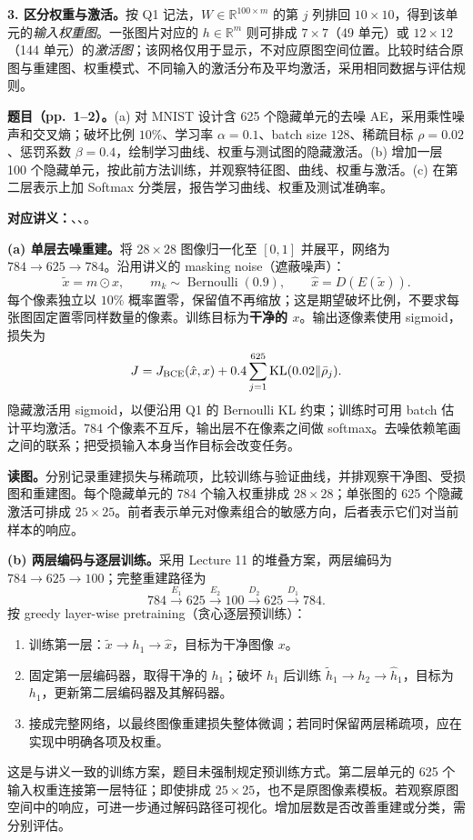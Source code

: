 \textbf{3. 区分权重与激活。}按 Q1 记法，$W\in\mathbb R^{100\times m}$ 的第 $j$ 列排回 $10\times10$，得到该单元的\emph{输入权重图}。一张图片对应的 $h\in\mathbb R^m$ 则可排成 $7\times7$（49 单元）或 $12\times12$（144 单元）的\emph{激活图}；该网格仅用于显示，不对应原图空间位置。比较时结合原图与重建图、权重模式、不同输入的激活分布及平均激活，采用相同数据与评估规则。

\nopagebreak[4]
\textbf{题目（pp.~1--2）。}(a) 对 MNIST 设计含 625 个隐藏单元的去噪 AE，采用乘性噪声和交叉熵；破坏比例 $10\%$、学习率 $\alpha=0.1$、batch size $128$、稀疏目标 $\rho=0.02$、惩罚系数 $\beta=0.4$，绘制学习曲线、权重与测试图的隐藏激活。(b) 增加一层 100 个隐藏单元，按此前方法训练，并观察特征图、曲线、权重与激活。(c) 在第二层表示上加 Softmax 分类层，报告学习曲线、权重及测试准确率。

\textbf{对应讲义：}、、。

\textbf{(a) 单层去噪重建。}将 $28\times28$ 图像归一化至 $[0,1]$ 并展平，网络为 $784\to625\to784$。沿用讲义的 masking noise（遮蔽噪声）：
\[
\tilde x=m\odot x,\qquad m_k\sim\operatorname{Bernoulli}(0.9),\qquad
\hat x=D(E(\tilde x)).
\]
每个像素独立以 $10\%$ 概率置零，保留值不再缩放；这是期望破坏比例，不要求每张图固定置零同样数量的像素。训练目标为\textbf{干净的 $x$}。输出逐像素使用 sigmoid，损失为
\[
J=J_{\rm BCE}(\hat x,x)+0.4\sum_{j=1}^{625}\mathrm{KL}(0.02\|\bar\rho_j).
\]
隐藏激活用 sigmoid，以便沿用 Q1 的 Bernoulli KL 约束；训练时可用 batch 估计平均激活。784 个像素不互斥，输出层不在像素之间做 softmax。去噪依赖笔画之间的联系；把受损输入本身当作目标会改变任务。

\textbf{读图。}分别记录重建损失与稀疏项，比较训练与验证曲线，并排观察干净图、受损图和重建图。每个隐藏单元的 784 个输入权重排成 $28\times28$；单张图的 625 个隐藏激活可排成 $25\times25$。前者表示单元对像素组合的敏感方向，后者表示它们对当前样本的响应。

\textbf{(b) 两层编码与逐层训练。}采用 Lecture 11 的堆叠方案，两层编码为 $784\to625\to100$；完整重建路径为
\[
784\xrightarrow{E_1}625\xrightarrow{E_2}100
\xrightarrow{D_2}625\xrightarrow{D_1}784.
\]
按 greedy layer-wise pretraining（贪心逐层预训练）：\nopagebreak[4]
\begin{enumerate}
 \item 训练第一层：$\tilde x\to h_1\to\hat x$，目标为干净图像 $x$。
 \item 固定第一层编码器，取得干净的 $h_1$；破坏 $h_1$ 后训练 $\tilde h_1\to h_2\to\hat h_1$，目标为 $h_1$，更新第二层编码器及其解码器。
 \item 接成完整网络，以最终图像重建损失整体微调；若同时保留两层稀疏项，应在实现中明确各项及权重。
\end{enumerate}
这是与讲义一致的训练方案，题目未强制规定预训练方式。第二层单元的 625 个输入权重连接第一层特征；即使排成 $25\times25$，也不是原图像素模板。若观察原图空间中的响应，可进一步通过解码路径可视化。增加层数是否改善重建或分类，需分别评估。

